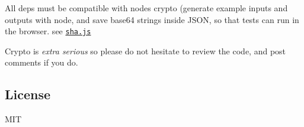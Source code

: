 All deps must be compatible with node\textquotesingle{}s crypto (generate example inputs and outputs with node, and save base64 strings inside J\+S\+ON, so that tests can run in the browser. see \href{https://github.com/dominictarr/sha.js}{\tt sha.\+js}

Crypto is {\itshape extra serious} so please do not hesitate to review the code, and post comments if you do.

\subsection*{License}

M\+IT 